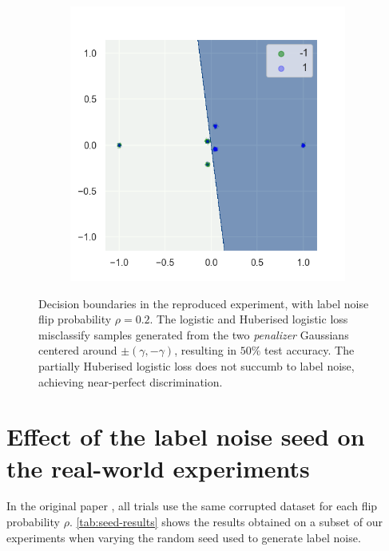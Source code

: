 \begin{figure}[htp]
\begin{subfigure}{0.31\linewidth}
    \label{fig:huber}
  \end{subfigure}
  \hfill
  \begin{subfigure}{0.31\linewidth}
        \includegraphics[width=\columnwidth]{figs/boundaries_Partial Huberised.png}
    \label{fig:phuber}
  \end{subfigure}
  \caption{Decision boundaries in the reproduced \textcite{long_random_2010} experiment, with label noise flip probability $\rho = 0.2$. The logistic and Huberised logistic loss misclassify samples generated from the two \emph{penalizer} Gaussians centered around $\pm(\gamma, -\gamma)$, resulting in $50\%$ test accuracy. The partially Huberised logistic loss does not succumb to label noise, achieving near-perfect discrimination.}
  \label{fig:syntheticboundaries}
\end{figure}

\section{Effect of the label noise seed on the real-world experiments}
In the original paper \parencite{menon_can_2019}, all trials use the same corrupted dataset for each flip probability $\rho$. \autoref{tab:seed-results} shows the results obtained on a subset of our experiments when varying the random seed used to generate label noise.

